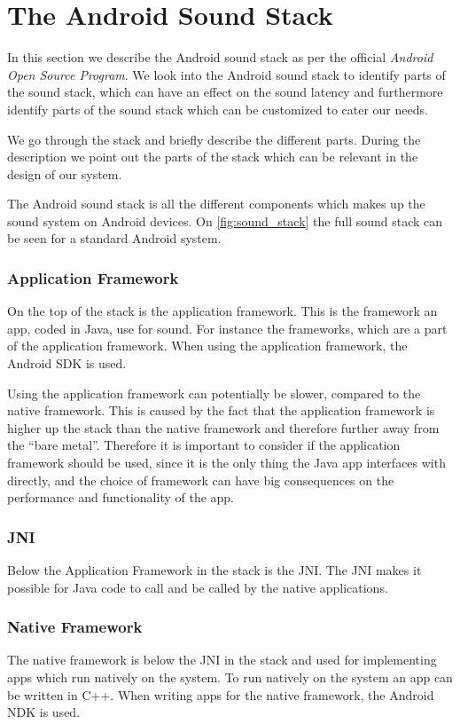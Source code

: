 \section{The Android Sound Stack}\label{sec:androidaudiostack}
In this section we describe the Android sound stack as per the official \textit{Android Open Source Program}\cite{sound_stack}.
We look into the Android sound stack to identify parts of the sound stack,
which can have an effect on the sound latency and furthermore identify parts of the sound stack which can be customized to cater our needs.

We go through the stack and briefly describe the different parts.
During the description we point out the parts of the stack which can be relevant in the design of our system.

The Android sound stack is all the different components which makes up the sound system on Android devices.
On \cref{fig:sound_stack} the full sound stack can be seen for a standard Android system.

\subsubsection{Application Framework}
On the top of the stack is the application framework.
This is the framework an app, coded in Java, use for sound.
For instance the  frameworks, which are a part of the application framework.
When using the application framework, the Android \ac{SDK} is used.

Using the application framework can potentially be slower, compared to the native framework.
This is caused by the fact that the application framework is higher up the stack than the native framework and therefore further away from the ``bare metal''.
Therefore it is important to consider if the application framework should be used,
since it is the only thing the Java app interfaces with directly,
and the choice of framework can have big consequences on the performance and functionality of the app.

\subsubsection{JNI}
Below the Application Framework in the stack is the \ac{JNI}.
The \ac{JNI} makes it possible for Java code to call and be called by the native applications\cite{jni}.

\subsubsection{Native Framework}
The native framework is below the \ac{JNI} in the stack and used for implementing apps which run natively on the system.
To run natively on the system an app can be written in C++.
When writing apps for the native framework, the Android \ac{NDK} is used.

